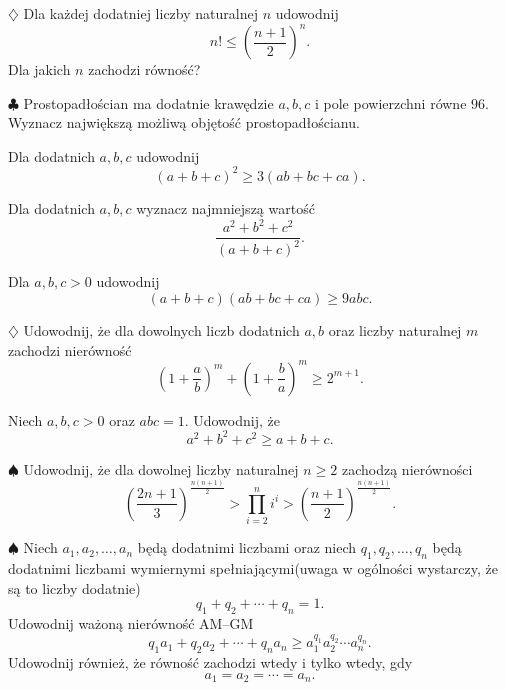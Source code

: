 \documentclass{lecture-kuznia}
\begin{document}
\begin{problem}{$\diamondsuit$}\label{Z5}
	Dla każdej dodatniej liczby naturalnej $n$ udowodnij
	\[
		n!\le\left(\frac{n+1}{2}\right)^n.
	\]
	Dla jakich $n$ zachodzi równość?
\end{problem}

\begin{problem}{$\clubsuit$}\label{Z6}
	Prostopadłościan ma dodatnie krawędzie $a,b,c$ i pole powierzchni równe $96$.
	Wyznacz największą możliwą objętość prostopadłościanu.
\end{problem}

\begin{problem}[$\redheart$]\label{Z7}
	Dla dodatnich $a,b,c$ udowodnij
	\[
		(a+b+c)^2\ge3(ab+bc+ca).
	\]
\end{problem}

\begin{problem}\label{Z8}
	Dla dodatnich $a,b,c$ wyznacz najmniejszą wartość
	\[
		\frac{a^2+b^2+c^2}{(a+b+c)^2}.
	\]
\end{problem}

\begin{problem}\label{Z9}
	Dla $a,b,c>0$ udowodnij
	\[
		(a+b+c)(ab+bc+ca)\ge9abc.
	\]
\end{problem}

\begin{problem}{$\diamondsuit$}\label{Z10}
	Udowodnij, że dla dowolnych liczb dodatnich $a,b$ oraz liczby naturalnej $m$
	zachodzi nierówność
	\[
		\left(1+\frac ab\right)^m+
		\left(1+\frac ba\right)^m
		\ge 2^{m+1}.
	\]
\end{problem}

\begin{problem}[$\redheart$]\label{Z11}
	Niech $a,b,c>0$ oraz $abc=1$. Udowodnij, że
	\[
		a^2+b^2+c^2\ge a+b+c.
	\]
\end{problem}

\begin{problem}{$\spadesuit$}\label{Z12}
	Udowodnij, że dla dowolnej liczby naturalnej $n\ge2$ zachodzą nierówności
	\[
		\left(\frac{2n+1}{3}\right)^{\frac{n(n+1)}2}
		>
		\prod_{i=2}^{n} i^i
		>
		\left(\frac{n+1}{2}\right)^{\frac{n(n+1)}2}.
	\]
\end{problem}

\begin{problem}{$\spadesuit$}\label{Z13}
	Niech $a_1,a_2,\dots,a_n$ będą dodatnimi liczbami oraz niech
	$q_1,q_2,\dots,q_n$ będą dodatnimi liczbami wymiernymi spełniającymi(uwaga w ogólności wystarczy, że są to liczby dodatnie)
	\[
		q_1+q_2+\cdots+q_n=1.
	\]
	Udowodnij ważoną nierówność AM--GM
	\[
		q_1a_1+q_2a_2+\cdots+q_na_n
		\ge
		a_1^{q_1}a_2^{q_2}\cdots a_n^{q_n}.
	\]
	Udowodnij również, że równość zachodzi wtedy i tylko wtedy, gdy
	\[
		a_1=a_2=\cdots=a_n.
	\]
\end{problem}
\end{document}
